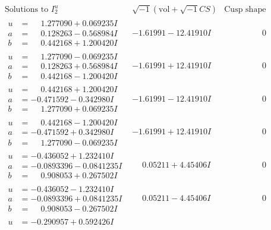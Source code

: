 \documentclass[1p]{elsarticle_modified}
\theoremstyle{definition}
\newcommand{\I}{\sqrt{-1}}
\begin{document}
$$\begin{array}{c|c|c}
\text{Solutions to }I^u_{2}& \I (\text{vol} + \sqrt{-1}CS) & \text{Cusp shape}\\
 \hline 
\begin{aligned}
u &= \phantom{-}1.277090 + 0.069235 I \\
a &= \phantom{-}0.128263 - 0.568984 I \\
b &= \phantom{-}0.442168 + 1.200420 I\end{aligned}
 & -1.61991 - 12.41910 I & \phantom{-0.000000 } 0 \\ \hline\begin{aligned}
u &= \phantom{-}1.277090 - 0.069235 I \\
a &= \phantom{-}0.128263 + 0.568984 I \\
b &= \phantom{-}0.442168 - 1.200420 I\end{aligned}
 & -1.61991 + 12.41910 I & \phantom{-0.000000 } 0 \\ \hline\begin{aligned}
u &= \phantom{-}0.442168 + 1.200420 I \\
a &= -0.471592 - 0.342980 I \\
b &= \phantom{-}1.277090 + 0.069235 I\end{aligned}
 & -1.61991 - 12.41910 I & \phantom{-0.000000 } 0 \\ \hline\begin{aligned}
u &= \phantom{-}0.442168 - 1.200420 I \\
a &= -0.471592 + 0.342980 I \\
b &= \phantom{-}1.277090 - 0.069235 I\end{aligned}
 & -1.61991 + 12.41910 I & \phantom{-0.000000 } 0 \\ \hline\begin{aligned}
u &= -0.436052 + 1.232410 I \\
a &= -0.0893396 - 0.0841235 I \\
b &= \phantom{-}0.908053 + 0.267502 I\end{aligned}
 & \phantom{-}0.05211 + 4.45406 I & \phantom{-0.000000 } 0 \\ \hline\begin{aligned}
u &= -0.436052 - 1.232410 I \\
a &= -0.0893396 + 0.0841235 I \\
b &= \phantom{-}0.908053 - 0.267502 I\end{aligned}
 & \phantom{-}0.05211 - 4.45406 I & \phantom{-0.000000 } 0 \\ \hline\begin{aligned}
u &= -0.290957 + 0.592426 I \\

\end{aligned}
\end{array}$$
\end{document}
